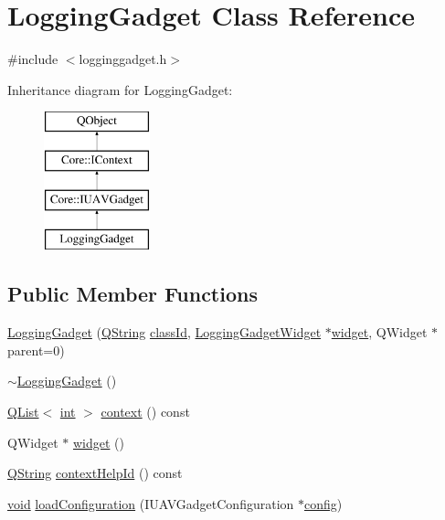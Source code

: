 \hypertarget{class_logging_gadget}{\section{Logging\-Gadget Class Reference}
\label{class_logging_gadget}
}


{\ttfamily \#include $<$logginggadget.\-h$>$}

Inheritance diagram for Logging\-Gadget\-:\begin{figure}[H]
\begin{center}
\leavevmode
\includegraphics[height=4.000000cm]{class_logging_gadget}
\end{center}
\end{figure}
\subsection*{Public Member Functions}
\begin{DoxyCompactItemize}
\item 
\hyperlink{group___g_c_s_control_gadget_plugin_gaf04a39f8faf77df7657801a58bf39bf9}{Logging\-Gadget} (\hyperlink{group___u_a_v_objects_plugin_gab9d252f49c333c94a72f97ce3105a32d}{Q\-String} \hyperlink{group___core_plugin_ga3878fde66a57220608960bcc3fbeef2c}{class\-Id}, \hyperlink{class_logging_gadget_widget}{Logging\-Gadget\-Widget} $\ast$\hyperlink{group___g_c_s_control_gadget_plugin_gaaa54cb505c0bcf94b159b6fb51cea991}{widget}, Q\-Widget $\ast$parent=0)
\item 
\hyperlink{group___g_c_s_control_gadget_plugin_gabcd5577c6960598473ac23935c47c958}{$\sim$\-Logging\-Gadget} ()
\item 
\hyperlink{class_q_list}{Q\-List}$<$ \hyperlink{ioapi_8h_a787fa3cf048117ba7123753c1e74fcd6}{int} $>$ \hyperlink{group___g_c_s_control_gadget_plugin_gadceb403447b87bafeda8fad2855d01bf}{context} () const 
\item 
Q\-Widget $\ast$ \hyperlink{group___g_c_s_control_gadget_plugin_gaaa54cb505c0bcf94b159b6fb51cea991}{widget} ()
\item 
\hyperlink{group___u_a_v_objects_plugin_gab9d252f49c333c94a72f97ce3105a32d}{Q\-String} \hyperlink{group___g_c_s_control_gadget_plugin_gaf63d806b2f5ac3cdf4c71fe9a241f7a8}{context\-Help\-Id} () const 
\item 
\hyperlink{group___u_a_v_objects_plugin_ga444cf2ff3f0ecbe028adce838d373f5c}{void} \hyperlink{group___g_c_s_control_gadget_plugin_ga7e66a1250e46435b2c92ff170afafeec}{load\-Configuration} (I\-U\-A\-V\-Gadget\-Configuration $\ast$\hyperlink{deflate_8c_a4473b5227787415097004fd39f55185e}{config})
\end{DoxyCompactItemize}
